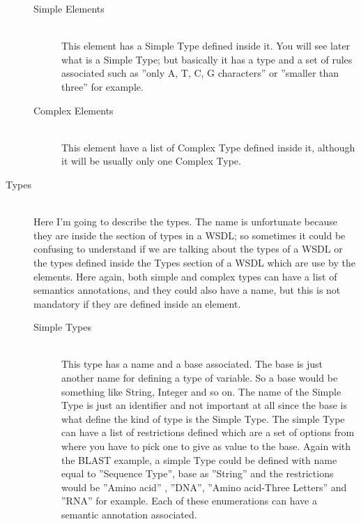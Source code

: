 \documentclass[a4paper,10pt]{article}
\begin{document}
\begin{description}
\begin{description}
	\item[Simple Elements] \hfill \\

	This element has a Simple Type defined inside it. You will see later what is a Simple Type; but basically it has a type and a set of rules associated such as ''only A, T, C, G characters'' or  ''smaller than three'' for example.

	\item[Complex Elements] \hfill \\
				
	This element have a list of Complex Type defined inside it, although it will be usually only one Complex Type.

      \end{description}

      \item[Types] \hfill \\

      Here I'm going to describe the types. The name is unfortunate because they are inside the section of types in a WSDL; so sometimes it could be confusing to understand if we are talking about the types of a WSDL or the types defined inside the Types section of a WSDL which are use by the elements. Here again, both simple and complex types can have 	a list of semantics annotations, and they could also have a name, but this is not mandatory if they are defined inside an element.

      \begin{description}
	\item[Simple Types] \hfill \\

	This type has a name and a base associated. The base is just another name for defining a type of variable. So a base would be something like String, Integer and so on. The name of the Simple Type is just an identifier and not important at all since the base is what define the kind of type is the Simple Type. The simple Type can have a list of restrictions defined which are a set of options from where you have to pick one to give as value to the base. Again with the BLAST example, a simple Type could be defined with name equal to ''Sequence Type'', base as ''String'' and the restrictions would be ''Amino acid'' , ''DNA'', ''Amino acid-Three Letters'' and ''RNA'' for example. Each of these enumerations can have a semantic annotation associated.


\end{description}
\end{description}
\end{document}
